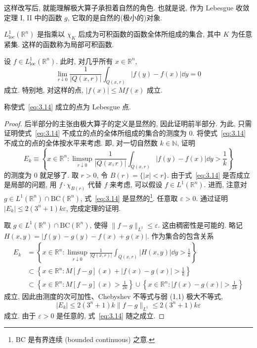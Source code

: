 这样改写后, 就能理解极大算子承担着自然的角色. 也就是说, 作为 Lebesgue 收敛定理 I, II 中的函数 $g$, 它取的是自然的(极小的)对象.

$L_{\mathrm{loc}}^{1}(\mathbb{R}^{n})$ 是指乘以 $\chi_{K}$ 后成为可积函数的函数全体所组成的集合, 其中 $K$ 为任意紧集. 这样的函数称为局部可积函数.

\begin{theorem}\label{thm:3.9}
设 $f \in L_{\mathrm{loc}}^{1}(\mathbb{R}^{n})$. 此时, 对几乎所有 $x \in \mathbb{R}^{n}$,
\begin{equation}\tag{3.14}
\lim_{r \downarrow 0}\frac{1}{|Q(x,r)|}\int_{Q(x,r)}|f(y) - f(x)|\dd y = 0
\label{eq:3.14}
\end{equation}
成立. 特别地, 对这样的点, $|f(x)| \leq Mf(x)$ 成立.
\end{theorem}

称使式~\eqref{eq:3.14} 成立的点为 Lebesgue 点.

\begin{proof}
后半部分的主张由极大算子的定义是显然的, 因此证明前半部分. 为此, 只需证明使式~\eqref{eq:3.14} 不成立的点的全体所组成的集合的测度为 $0$. 将使式~\eqref{eq:3.14} 不成立的点的全体按水平来考虑. 即, 对一切自然数 $k \in \mathbb{N}$, 证明
\[
E_{k} \equiv \left\{x \in \mathbb{R}^{n}: \limsup_{r \downarrow 0}\frac{1}{|Q(x,r)|}\int_{Q(x,r)}|f(y) - f(x)|\dd y > \frac{1}{k}\right\}
\]
的测度为 $0$ 就足够了. 取 $r > 0$, 令 $B(r) = \{|x| < r\}$. 由于式~\eqref{eq:3.14} 是否成立是局部的问题, 用 $f \cdot \chi_{B(r)}$ 代替 $f$ 来考虑, 可以假设 $f \in L^{1}(\mathbb{R}^{n})$. 进而, 注意对 $g \in L^{1}(\mathbb{R}^{n}) \cap \mathrm{BC}(\mathbb{R}^{n})$, 式~\eqref{eq:3.14} 是显然的\footnote{BC 是有界连续 (bounded continuous) 之意.}. 任意取 $\varepsilon > 0$. 通过证明 $|E_{k}| \leq 2(3^{n}+1)k\varepsilon$, 完成定理的证明.

取 $g \in L^{1}(\mathbb{R}^{n}) \cap \mathrm{BC}(\mathbb{R}^{n})$, 使得 $\|f - g\|_{L^{1}} \leq \varepsilon$. 这由稠密性是可能的. 略记 $H(x, y) = |f(y) - g(y) - f(x) + g(x)|$. 作为集合的包含关系
\begin{equation}
\begin{aligned}
E_{k} &= \left\{x \in \mathbb{R}^{n}: \limsup_{r \downarrow 0}\frac{1}{|Q(x,r)|}\int_{Q(x,r)}|H(x,y)|\dd y > \frac{1}{k}\right\} \\
&\subset \left\{x \in \mathbb{R}^{n}: M[f-g](x) + |f(x) - g(x)| > \frac{1}{k}\right\} \\
&\subset \left\{x \in \mathbb{R}^{n}: M[f-g](x) > \frac{1}{2k}\right\} \cup \left\{x \in \mathbb{R}^{n}: |f(x) - g(x)| > \frac{1}{2k}\right\}
\end{aligned}\tag{3.15}
\label{eq:3.15}
\end{equation}
成立, 因此由测度的次可加性、Chebyshev 不等式与弱 (1,1) 极大不等式,
\[
|E_{k}| \leq 2(3^{n}+1)k\|f - g\|_{L^{1}} \leq 2(3^{n}+1)k\varepsilon
\]
成立. 由于 $\varepsilon > 0$ 是任意的, 式~\eqref{eq:3.14} 随之成立.
\end{proof}

